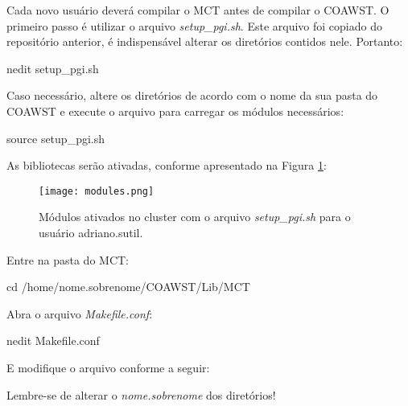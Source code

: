 \noindent Cada novo usuário deverá compilar o MCT antes de compilar o COAWST. O primeiro passo é utilizar o arquivo \textit{setup\_pgi.sh}. 
          Este arquivo foi copiado do repositório anterior, é indispensável alterar os diretórios contidos nele. Portanto:
\bigskip

\begin{bashcode}
nedit setup_pgi.sh
\end{bashcode}
\bigskip

\noindent Caso necessário, altere os diretórios de acordo com o nome da sua pasta do COAWST e execute o arquivo para carregar os módulos necessários:
\bigskip

\begin{bashcode}
source setup_pgi.sh
\end{bashcode}
\bigskip

\noindent As bibliotecas serão ativadas, conforme apresentado na Figura \textcolor{bleu_cite}{\ref{modulos}}:
\bigskip


\begin{figure}[H]
    \centering
    \texttt{[image: modules.png]}
    \caption{Módulos ativados no cluster com o arquivo \textit{setup\_pgi.sh} para o usuário adriano.sutil.}
    \label{modulos}
\end{figure}
\bigskip


\noindent Entre na pasta do MCT:
\bigskip

\begin{bashcode}
cd /home/nome.sobrenome/COAWST/Lib/MCT
\end{bashcode}
\bigskip

\noindent Abra o arquivo \textit{Makefile.conf}:
\bigskip


\begin{bashcode}
nedit Makefile.conf
\end{bashcode}
\bigskip

\noindent E modifique o arquivo conforme a seguir:
\bigskip

\begin{tcolorbox}[enhanced,
  grow to left by=0cm,%
  grow to right by=0cm,%
  enlarge top by=0cm,%
  enlarge bottom by=0cm,%
  tcbox raise base,
  boxrule=1.0pt,
  left=18mm,
  colframe=red!50!black,coltext=red!25!black,colback=red!10!white,
  overlay={\begin{tcbclipinterior}\fill[red!75!blue!50!white] (frame.south west)
    rectangle node[text=white,font=\sffamily\bfseries\footnotesize,rotate=0] {ATENÇÃO} ([xshift=18mm]frame.north west);\end{tcbclipinterior}}]
Lembre-se de alterar o \textit{nome.sobrenome} dos diretórios!
\end{tcolorbox}
\bigskip

